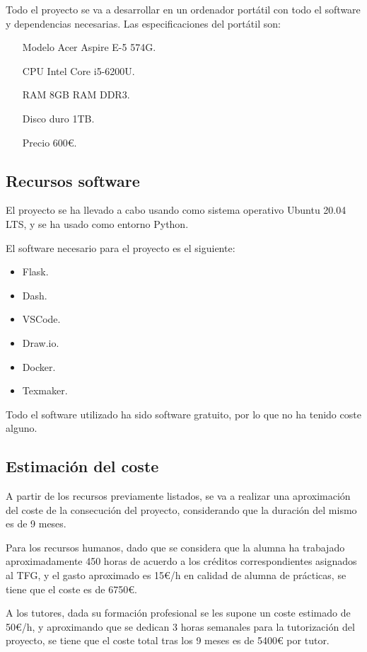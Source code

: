 Todo el proyecto se va a desarrollar en un ordenador portátil con todo el software y dependencias necesarias. Las especificaciones del portátil son:

\begin{itemize}
\item[Modelo] Acer Aspire E-5 574G.
\item[CPU] Intel Core i5-6200U.
\item[RAM] 8GB RAM DDR3.
\item[Disco duro] 1TB.
\item[Precio] 600€.
\end{itemize}

\subsection{Recursos software}

El proyecto se ha llevado a cabo usando como sistema operativo Ubuntu 20.04 LTS, y se ha usado como entorno Python.

El software necesario para el proyecto es el siguiente:

\begin{itemize}
\item Flask.
\item Dash.
\item VSCode.
\item Draw.io.
\item Docker.
\item Texmaker.
\end{itemize}

Todo el software utilizado ha sido software gratuito, por lo que no ha tenido coste alguno.

\subsection{Estimación del coste}

A partir de los recursos previamente listados, se va a realizar una aproximación del coste de la consecución del proyecto, considerando que la duración del mismo es de 9 meses.

Para los recursos humanos, dado que se considera que la alumna ha trabajado aproximadamente 450 horas de acuerdo a los créditos correspondientes asignados al TFG, y el gasto aproximado es 15€/h en calidad de alumna de prácticas, se tiene que el coste es de 6750€.

A los tutores, dada su formación profesional se les supone un coste estimado de 50€/h, y aproximando que se dedican 3 horas semanales para la tutorización del proyecto, se tiene que el coste total tras los 9 meses es de 5400€ por tutor.

